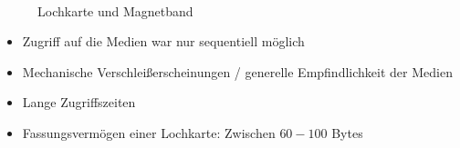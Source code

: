 \begin{frame}{\insertsection}
\framesubtitle{\insertsubsection}
	\begin{figure}
	 \hspace{2em}
	\caption{Lochkarte und Magnetband}
	\end{figure}
		\begin{itemize}
			\item Zugriff auf die Medien war nur sequentiell möglich
			\item Mechanische Verschleißerscheinungen / generelle Empfindlichkeit der Medien
			\item Lange Zugriffszeiten
			\item Fassungsvermögen einer Lochkarte: Zwischen $60-100$ Bytes
		\end{itemize}
\end{frame}

%

